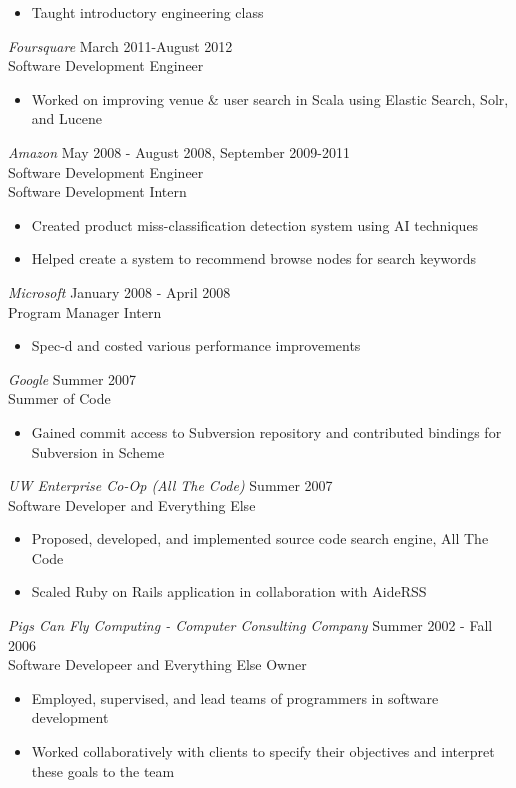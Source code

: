 \documentclass[10pt,line,margin=0.1]{newsres}
\begin{document}
\begin{resume}
\begin{itemize}
          \item Taught introductory engineering class
        \end{itemize}
        {\sl Foursquare} \hfill March 2011-August 2012\\
        Software Development Engineer
        \begin{itemize}  \itemsep -2pt %
        \item Worked on improving venue \& user search in Scala using Elastic Search, Solr, and Lucene
        \end{itemize}
        {\sl Amazon} \hfill            May 2008 - August 2008, September 2009-2011 \\
        Software Development Engineer \\
        Software Development Intern
        \begin{itemize}  \itemsep -2pt %
        \item Created product miss-classification detection system using AI techniques
        \item Helped create a system to recommend browse nodes for search keywords
        \end{itemize} 
        {\sl Microsoft} \hfill        January 2008 - April 2008 \\
        Program Manager Intern
        \begin{itemize}
        \item Spec-d and costed various performance improvements
        \end{itemize} 
        {\sl Google} \hfill        Summer 2007 \\
        Summer of Code
        \begin{itemize}
        \item Gained commit access to Subversion repository and contributed bindings for Subversion in Scheme
        \end{itemize} 
        {\sl UW Enterprise Co-Op (All The Code)} \hfill Summer 2007 \\
        Software Developer and Everything Else
        \begin{itemize}  \itemsep -2pt %
        \item{Proposed, developed, and implemented source code search engine, All The Code}
        \item{Scaled Ruby on Rails application in collaboration with AideRSS}
        \end{itemize}
        {\sl Pigs Can Fly Computing - Computer Consulting Company} \hfill Summer 2002 - Fall 2006 \\
        Software Developeer and Everything Else Owner
        \begin{itemize}  \itemsep -2pt %
        \item{Employed, supervised, and lead teams of programmers in software development}
        \item{Worked collaboratively with clients to specify their objectives and interpret these goals to the team}
        \end{itemize}


\end{resume}
\end{document}
